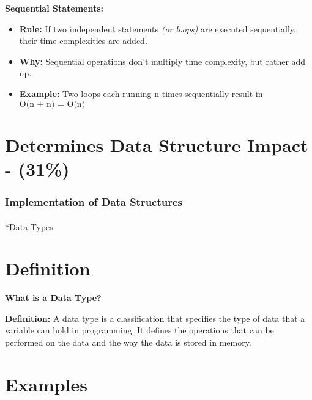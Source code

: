 \documentclass[
  letterpaper,
  DIV=11,
  numbers=noendperiod]{scrreprt}
\makeatletter
\let\oldparagraph\paragraph
\renewcommand{\paragraph}{
    \@ifstar
      \xxxParagraphStar
      \xxxParagraphNoStar
  }
\newcommand{\xxxParagraphStar}[1]{\oldparagraph*{#1}\mbox{}}
\newcommand{\xxxParagraphNoStar}[1]{\oldparagraph{#1}\mbox{}}
\providecommand{\tightlist}{%
  \setlength{\itemsep}{0pt}\setlength{\parskip}{0pt}}
\makeatother
\begin{document}
\begin{tcolorbox}[enhanced jigsaw, colframe=quarto-callout-note-color-frame, toprule=.15mm, bottomrule=.15mm, rightrule=.15mm, colback=white, breakable, arc=.35mm, opacityback=0, left=2mm, leftrule=.75mm]
\textbf{Sequential Statements:}

\begin{itemize}
\tightlist
\item
  \textbf{Rule:} If two independent statements \emph{(or loops)} are
  executed sequentially, their time complexities are added.
\item
  \textbf{Why:} Sequential operations don't multiply time complexity,
  but rather add up.
\item
  \textbf{Example:} Two loops each running n times sequentially result
  in \(\text{O(n + n) = O(n)}\)
\end{itemize}

\end{tcolorbox}

\section*{Determines Data Structure Impact -
(31\%)}\label{determines-data-structure-impact---31}


\subsubsection*{Implementation of Data
Structures}\label{implementation-of-data-structures}

\paragraph*{Data Types}\label{data-types}

\section{Definition}

\textbf{What is a Data Type?}

\textbf{Definition:} A data type is a classification that specifies the
type of data that a variable can hold in programming. It defines the
operations that can be performed on the data and the way the data is
stored in memory.

\section{Examples}
\end{document}
